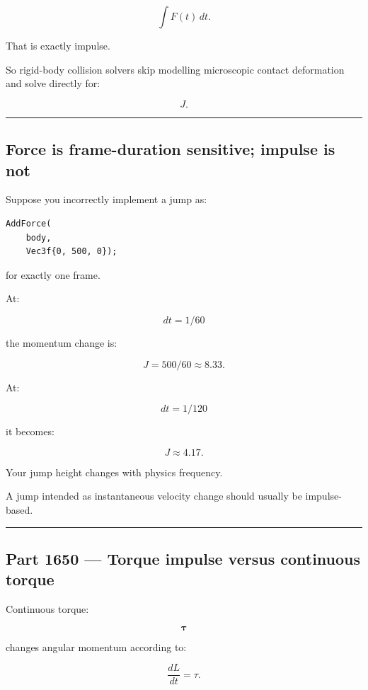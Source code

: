 \[
\int F(t)\,dt.
\]

That is exactly impulse.

So rigid-body collision solvers skip modelling microscopic contact deformation and solve directly for:

\[
J.
\]

\begin{center}\rule{0.5\linewidth}{0.5pt}\end{center}

\subsection{Force is frame-duration sensitive; impulse is not}\label{06-engine-ii-ch036-force-is-frame-duration-sensitive-impulse-is-not}

Suppose you incorrectly implement a jump as:

\begin{verbatim}
AddForce(
    body,
    Vec3f{0, 500, 0});
\end{verbatim}

for exactly one frame.

At:

\[
dt=1/60
\]

the momentum change is:

\[
J=500/60\approx8.33.
\]

At:

\[
dt=1/120
\]

it becomes:

\[
J\approx4.17.
\]

Your jump height changes with physics frequency.

A jump intended as instantaneous velocity change should usually be impulse-based.

\begin{center}\rule{0.5\linewidth}{0.5pt}\end{center}

\subsection{Part 1650 --- Torque impulse versus continuous torque}\label{06-engine-ii-ch036-part-1650-torque-impulse-versus-continuous-torque}

Continuous torque:

\[
\boldsymbol\tau
\]

changes angular momentum according to:

\[
\frac{dL}{dt}
=
\tau.
\]

